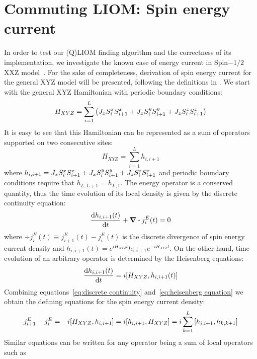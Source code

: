 \section{Commuting LIOM: Spin energy current}
In order to test our (Q)LIOM finding algorithm and the correctness of its implementation, we investigate the known case of
energy current in Spin\(-1/2\) XXZ model~\autocite*{Mierzejewski2015Approx}. For the sake of completeness, derivation of
spin energy current for the general XYZ model will be presented, following the definitions in \textcite{Zotos1997}.
We start with the general XYZ Hamiltonian with periodic boundary conditions:
\begin{equation}
  H_{XYZ} = \sum_{i=1}^L  \left( J_{x} S^{x}_{i}S^{x}_{i+1} + J_{x} S^{y}_{i}S^{y}_{i+1} + J_{z} S^{z}_{i}S^{z}_{i+1} \right)
\end{equation}
It is easy to see that this Hamiltonian can be represented as a sum of operators supported on two consecutive sites:
\begin{equation}
  H_{XYZ} = \sum_{i=1}^L h_{i,i+1}
\end{equation}
where \(h_{i,i+1} = J_{x} S^{x}_{i}S^{x}_{i+1} + J_{x} S^{y}_{i}S^{y}_{i+1} + J_{z} S^{z}_{i}S^{z}_{i+1} \) and periodic boundary conditions
require that \(h_{L,L+1} = h_{L,1}\). The energy operator is a conserved quantity, thus the time evolution of its local density
is given by the discrete continuity equation:
\begin{equation}
  \dv{h_{i,i+1}(t)}{t} + \div{j_{i}^{E}(t)} = 0
  \label{eq:discrete continuity}
\end{equation}
where \(\div{j_{i}^E(t)} \equiv j_{i+1}^E(t) - j_{i}^E(t)\) is the discrete divergence of spin energy current density and \(h_{i,i+1}(t) = e^{i H_{XYZ}t} h_{i,i+1} e^{-i H_{XYZ} t}\).
On the other hand, time evolution of an arbitrary operator is determined
by the Heisenberg equations:
\begin{equation}
  \dv{h_{i,i+1}(t)}{t} = i \comm{H_{XYZ}}{h_{i,i+1}(t)}
  \label{eq:heisenberg equation}
\end{equation}
Combining equations~\eqref{eq:discrete continuity} and~\eqref{eq:heisenberg equation} we obtain the defining equations for
the spin energy current density:
\begin{equation}
  j_{i+1}^E - j_{i}^E = - i \comm{H_{XYZ}}{h_{i,i+1}} = i \comm{h_{i,i+1}}{H_{XYZ}} = i \sum_{k=1}^L \comm{h_{i,i+1}}{h_{k,k+1}}
  \label{eq:energy current defining equation}
\end{equation}
Similar equations can be written for any operator being a sum of local operators such as
